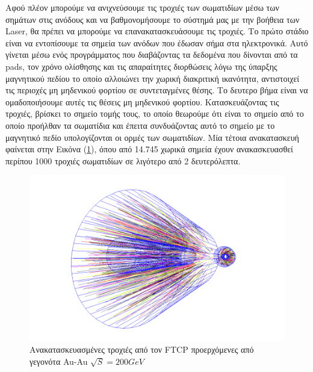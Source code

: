 	 Αφού πλέον μπορούμε να ανιχνεύσουμε τις τροχιές των σωματιδίων μέσω των σημάτων στις ανόδους και να βαθμονομήσουμε το σύστημά μας με την βοήθεια των Laser, θα πρέπει να μπορούμε να επανακατασκευάσουμε τις τροχιές.
	  Το πρώτο στάδιο είναι να εντοπίσουμε τα σημεία των ανόδων που έδωσαν σήμα στα ηλεκτρονικά. Αυτό γίνεται μέσω ενός προγράμματος που διαβάζοντας τα δεδομένα που δίνονται από τα pads, τον χρόνο ολίσθησης και τις απαραίτητες διορθώσεις λόγω της ύπαρξης μαγνητικού πεδίου το οποίο αλλοιώνει την χωρική διακριτική ικανότητα, αντιστοιχεί τις περιοχές μη μηδενικού φορτίου σε συντεταγμένες θέσης. 
	  Το δευτερο βήμα είναι να ομαδοποιήσουμε αυτές τις θέσεις μη μηδενικού φορτίου. Κατασκευάζοντας τις τροχιές, βρίσκει το σημείο τομής τους, το οποίο θεωρούμε ότι είναι το σημείο από το οποίο προήλθαν τα σωματίδια και έπειτα συνδυάζοντας αυτό το σημείο με το μαγνητικό πεδίο υπολογίζονται οι ορμές των σωματιδίων. Μία τέτοια ανακατασκευή φαίνεται στην Εικόνα (\ref{fig3.4}), όπου από 14.745 χωρικά σημεία έχουν ανακασκευασθεί περίπου 1000 τροχιές σωματιδίων σε λιγότερο από 2 δευτερόλεπτα.
	  
	  \begin{figure}[h!]
	  		\centering
	  		\includegraphics[scale=0.5]{STAR_Detectors/FTPC_Reconstruction}	
	  		\caption{Ανακατασκευασμένες τροχιές από τον FTCP προερχόμενες από γεγονότα Au-Au $\sqrt{S}=200GeV$}  
	  		\label{fig3.4}
	  \end{figure}
	  
